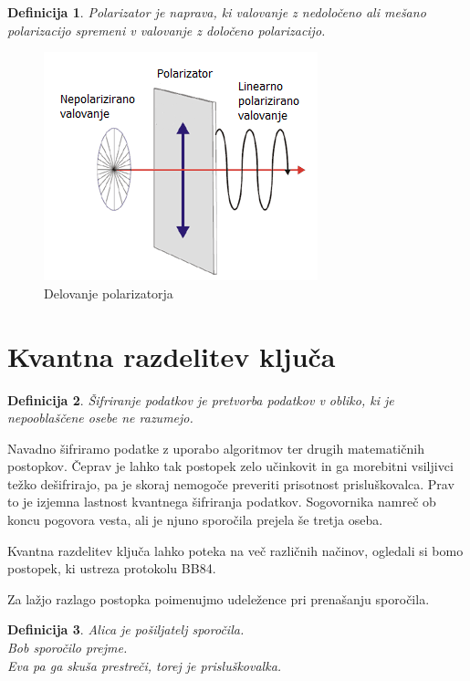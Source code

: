 \documentclass[A4paper, 11pt]{article}
\newtheorem{definicija}{Definicija}
\begin{document}
\begin{definicija}
Polarizator je naprava, ki valovanje z nedoločeno ali mešano polarizacijo spremeni v valovanje z določeno polarizacijo.
\end{definicija}

\begin{figure}[h]
\centering
\caption{Delovanje polarizatorja}
\includegraphics[scale=0.8]{2}
\end{figure}

\pagebreak



\section{Kvantna razdelitev ključa}

\begin{definicija}
Šifriranje podatkov je pretvorba podatkov v obliko, ki je nepooblaščene osebe ne razumejo.
\end{definicija}

Navadno šifriramo podatke z uporabo algoritmov ter drugih matematičnih postopkov. Čeprav je lahko tak postopek zelo učinkovit in ga morebitni vsiljivci težko dešifrirajo, pa je skoraj nemogoče preveriti prisotnost prisluškovalca. Prav to je izjemna lastnost kvantnega šifriranja podatkov. Sogovornika namreč ob koncu pogovora vesta, ali je njuno sporočila prejela še tretja oseba.

Kvantna razdelitev ključa lahko poteka na več različnih načinov, ogledali si bomo postopek, ki ustreza protokolu BB84.

Za lažjo razlago postopka poimenujmo udeležence pri prenašanju sporočila.

\begin{definicija}
Alica je pošiljatelj sporočila.\\
Bob sporočilo prejme.\\
Eva pa ga skuša prestreči, torej je prisluškovalka.
\end{definicija}
\end{document}

